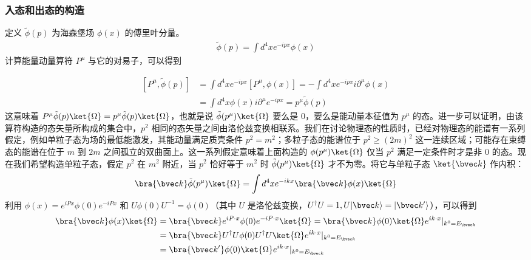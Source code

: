 
\subsubsection{入态和出态的构造}
定义 $\tilde{\phi}(p)$ 为海森堡场 $\phi(x)$ 的傅里叶分量。
\begin{equation}
\begin{aligned}
\tilde\phi(p)=\int d^4 {x} e^{-ipx} \phi(x)
\end{aligned}
\end{equation}
计算能量动量算符 $P^\mu$ 与它的对易子，可以得到

\begin{equation}\label{eq_LSZ_2}
\begin{aligned}
[P^\mu, \tilde\phi(p)] &=\int d^4 {x} e^{-ipx} [P^\mu,\phi(x)]=-\int d^4 {x} e^{-ipx} i\partial^\mu \phi(x)\\
&=\int d^4 {x} \phi(x) i\partial^\mu e^{-ipx}=p^\mu \tilde\phi(p)
\end{aligned}
\end{equation}
这意味着 $P^\mu \tilde \phi(p)\ket{\Omega}=p^\mu \tilde{\phi}(p)\ket{\Omega}$，也就是说 $\tilde\phi (p^\mu) \ket{\Omega}$ 要么是 $0$，要么是能动量本征值为 $p^\mu$ 的态。进一步可以证明，由该算符构造的态矢量所构成的集合中，$p^2$ 相同的态矢量之间由洛伦兹变换相联系。我们在讨论物理态的性质时，已经对物理态的能谱有一系列假定，例如单粒子态为场的最低能激发，其能动量满足质壳条件 $p^2=m^2$；多粒子态的能谱位于 $p^2\ge (2m)^2$ 这一连续区域；可能存在束缚态的能谱在位于 $m$ 到 $2m$ 之间孤立的双曲面上。这一系列假定意味着上面构造的 $\phi(p^\mu)\ket{\Omega}$ 仅当 $p^2$ 满足一定条件时才是非 $0$ 的态。现在我们希望构造单粒子态，假定 $p^2$ 在 $m^2$ 附近，当 $p^2$ 恰好等于 $m^2$ 时 $\tilde{\phi}(p^\mu)\ket{\Omega}$ 才不为零。将它与单粒子态 $\ket{\bvec k}$ 作内积：
\[
\bra{\bvec k} \tilde\phi(p^\mu) \ket{\Omega}=\int d^4 {x} e^{-ikx}\bra{\bvec k}\phi(x)\ket{\Omega}
\]
利用 $\phi(x)=e^{iPx}\phi(0)e^{-iPx}$ 和 $U\phi(0)U^{-1}=\phi(0)$（其中 $U$ 是洛伦兹变换，$U^\dagger U=1,U |\bvec k\rangle = |\bvec k'\rangle$），可以得到
\begin{equation}\begin{aligned}
\bra{\bvec k}\phi(x)\ket{\Omega}&=
\bra{\bvec k}e^{iP\cdot x}\phi(0) e^{-i P\cdot x}\ket{\Omega} = \bra{\bvec k}\phi(0)\ket{\Omega} e^{ik\cdot x}|_{k^0=E_{\bvec k}} \\
&=\bra{\bvec k}U^\dagger U\phi(0)U^\dagger U\ket{\Omega} e^{ik\cdot x}|_{k^0=E_{\bvec k}}\\
&=\bra{\bvec k'}\phi(0)\ket{\Omega} e^{ik\cdot x}|_{k^0=E_{\bvec k}}
\end{aligned}\end{equation}
